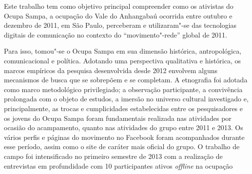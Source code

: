 Este trabalho tem como objetivo principal compreender como os
ativistas do Ocupa Sampa, a ocupação do Vale do Anhangabaú ocorrida
entre outubro e dezembro de 2011, em São Paulo, perceberam e
utilizaram"-se das tecnologias digitais de comunicação no contexto do
``movimento"-rede'' global de 2011.

Para isso, tomou"-se o Ocupa Sampa em sua dimensão histórica,
antropológica, comunicacional e política. Adotando uma perspectiva
qualitativa e histórica, os marcos empíricos da pesquisa desenvolvida
desde 2012 envolvem alguns mecanismos de busca que se sobrepõem e se
completam. A etnografia foi adotada como marco metodológico
privilegiado; a observação participante, a convivência prolongada com o
objeto de estudos, a imersão no universo cultural investigado e,
principalmente, as trocas e cumplicidades estabelecidas entre os
pesquisadores e os jovens do Ocupa Sampa foram fundamentais realizada
nas atividades por ocasião do acampamento, quanto nas atividades do
grupo entre 2011 e 2013. Os vários perfis e páginas do movimento no
Facebook foram acompanhados durante esse período, assim como o site de
caráter mais oficial do grupo. O trabalho de campo foi intensificado no
primeiro semestre de 2013 com a realização de entrevistas em
profundidade com 10 participantes ativos \emph{offline} na ocupação
